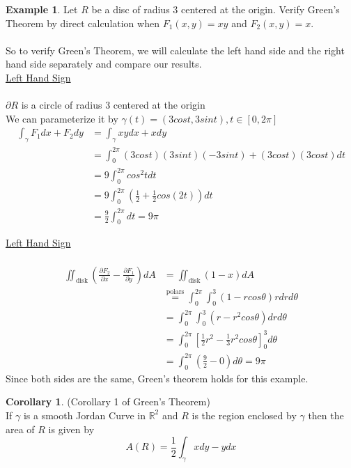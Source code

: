\documentclass[12pt]{article}
\theoremstyle{plain}
\theoremstyle{definition}
\newtheorem{example}[theorem]{Example}
\newtheorem{corollary}[theorem]{Corollary}
\begin{document}
	\begin{example}
		Let $R$ be a disc of radius 3 centered at the origin. Verify Green's Theorem by direct calculation when $F_1 (x,y) =  xy$ and $F_2 (x,y) = x$.\\
		\\
		So to verify Green's Theorem, we will calculate the left hand side and the right hand side separately and compare our results.\\
		\underline{Left Hand Sign}\\
		\\
		$\partial R$ is a circle of radius 3 centered at the origin\\
		We can parameterize it by $\gamma (t) = (3cost, 3sint), t\in [0,2\pi]$
		\begin{align*}
			\int_\gamma F_1 dx + F_2 dy &= \int_\gamma xydx + xdy\\
			&= \int^{2\pi}_0 (3cost)(3sint)(-3sint)+ (3cost)(3cost)dt\\
			&= 9 \int^{2\pi}_0 cos^2 t dt\\
			&= 9 \int^{2\pi}_0 (\frac{1}{2} + \frac{1}{2}cos(2t)) dt\\
			&= \frac{9}{2} \int^{2\pi}_0 dt = 9\pi
		\end{align*}

		\underline{Left Hand Sign}\\
		\\
		\begin{align*}
			\iint_{\text{disk}} (\frac{\partial F_2}{\partial x} - \frac{\partial F_1}{\partial y})dA &= \iint_{\text{disk}} (1-x) dA\\
			&\overset{\text{polars}}{=} \int^{2\pi}_0 \int^3_0 (1-rcos\theta)rdrd\theta\\
			&=\int^{2\pi}_0 \int^3_0 (r-r^2cos\theta)drd\theta\\
			&=\int^{2\pi}_0 [\frac{1}{2}r^2 - \frac{1}{3} r^2 cos\theta]^3_0 d\theta\\
			&=\int^{2\pi}_0 (\frac{9}{2}-0) d\theta = 9\pi
		\end{align*}
		Since both sides are the same, Green's theorem holds for this example.
	\end{example}

	\begin{corollary}
		(Corollary 1 of Green's Theorem)\\
		If $\gamma$ is a smooth Jordan Curve in $\mathbb{R}^2$ and $R$ is the region enclosed by $\gamma$ then the area of $R$ is given by
		$$A(R) = \frac{1}{2} \int_\gamma xdy-ydx$$
	\end{corollary}
\end{document}
